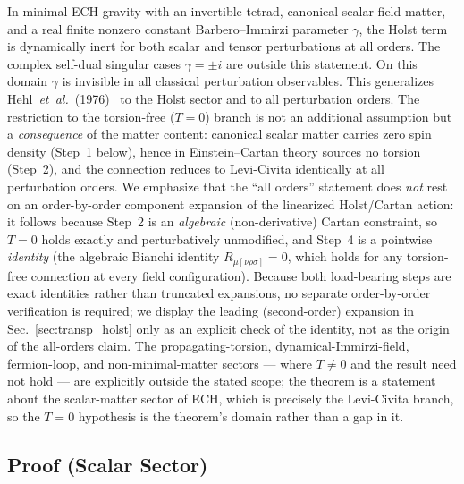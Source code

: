 \documentclass[aps,prd,twocolumn,superscriptaddress,showpacs,preprintnumbers,nofootinbib,longbibliography,floatfix]{revtex4-2}
\newcommand{\etal}{\textit{et~al.}}
\begin{document}
In minimal ECH gravity with an invertible tetrad, canonical scalar field
matter, and a real finite nonzero constant Barbero--Immirzi parameter
$\gamma$, the Holst term is dynamically inert for both scalar and tensor
perturbations at all orders.  The complex self-dual singular cases
$\gamma=\pm i$ are outside this statement.  On this domain $\gamma$ is
invisible in all classical perturbation observables.
This generalizes Hehl~\etal~(1976)~\cite{Hehl1976} to the Holst sector and to
all perturbation orders. The restriction to the torsion-free ($T=0$) branch is
not an additional assumption but a \emph{consequence} of the matter content:
canonical scalar matter carries zero spin density (Step~1 below), hence in
Einstein--Cartan theory sources no torsion (Step~2), and the connection reduces
to Levi-Civita identically at all perturbation orders. We emphasize that the
``all orders'' statement does \emph{not} rest on an order-by-order component
expansion of the linearized Holst/Cartan action: it follows because Step~2 is
an \emph{algebraic} (non-derivative) Cartan constraint, so $T=0$ holds
exactly and perturbatively unmodified, and Step~4 is a pointwise
\emph{identity} (the algebraic Bianchi identity $R_{\mu[\nu\rho\sigma]}=0$,
which holds for any torsion-free connection at every field configuration).
Because both load-bearing steps are exact identities rather than truncated
expansions, no separate order-by-order verification is required; we display
the leading (second-order) expansion in Sec.~\ref{sec:transp_holst} only as an
explicit check of the identity, not as the origin of the all-orders claim. The propagating-torsion,
dynamical-Immirzi-field, fermion-loop, and non-minimal-matter sectors --- where
$T\neq0$ and the result need not hold --- are explicitly outside the stated
scope; the theorem is a statement about the scalar-matter sector of ECH, which
is precisely the Levi-Civita branch, so the $T=0$ hypothesis is the theorem's
domain rather than a gap in it.

\subsection{Proof (Scalar Sector)}\label{sec:transp_proof}
\end{document}
